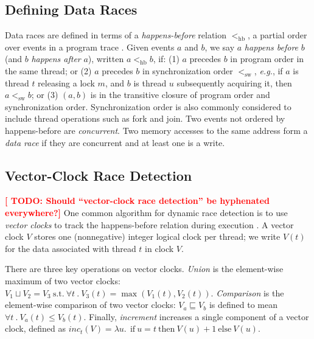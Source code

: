 \documentclass[preprint, 10pt]{sigplanconf}
\newcommand{\eg}{\textit{e.g.}\xspace}
\newcommand{\TODO}[1]{\textbf{\textcolor{red}{[ TODO: #1]}}}
\newcommand{\hb}[0]{<_{\mathrm{hb}}}
\newcommand{\sw}[0]{<_{\mathrm{sw}}}
\newcommand{\Tid}{t}
\newcommand{\TidU}{u}
\newcommand{\Lock}{m}
\newcommand{\VC}{V}
\newcommand{\SuchThat}{\ \text{s.t.}\ }
\newcommand{\Bind}{\ .\ }
\newcommand{\VCMax}{\sqcup}
\newcommand{\VCCompare}{\sqsubseteq}
\begin{document}
\subsection{Defining Data Races}
Data races are defined in terms of a \emph{happens-before} relation $\hb$, a partial order over events in a
program trace \cite{lamporthb}.  Given events $a$ and $b$, we say $a$
\emph{happens before} $b$ (and $b$ \emph{happens after} $a$), written $a \hb b$,
if: (1) $a$ precedes $b$ in program order in the same thread; or (2) $a$
precedes $b$ in synchronization order $\sw$, \eg, if $a$ is thread $\Tid$ releasing a lock $\Lock$, and $b$ is thread $\TidU$ subsequently acquiring it, then $a \sw b$; or (3) $(a,b)$ is in the
transitive closure of program order and synchronization order.
Synchronization order is also commonly considered to include thread operations such as fork and join.
Two events not ordered by happens-before are \emph{concurrent}.  Two
memory accesses to the same address form a \emph{data race} if they are
concurrent and at least one is a write.

\subsection{Vector-Clock Race Detection}
\label{vector-clocks}
\TODO{Should ``vector-clock race detection'' be hyphenated everywhere?}
One common algorithm for dynamic race detection is to use \emph{vector clocks} to track the happens-before relation during
execution \cite{vcfidge,vcmattern}.  A vector clock $\VC$ stores one (nonnegative) integer
logical clock per thread; we write $\VC(\Tid)$ for the data associated with thread $\Tid$ in clock $\VC$.

  There are three key operations on vector clocks.
\emph{Union} is the element-wise maximum of two vector clocks:
$\VC_1 \VCMax \VC_2 = \VC_3 \SuchThat \forall \Tid \Bind \VC_3(\Tid) =
\max(\VC_1(\Tid), \VC_2(\Tid))$. \emph{Comparison} is the element-wise
comparison of two vector clocks: $\VC_a \VCCompare \VC_b$ is defined to mean $\forall
\Tid \Bind \VC_a(\Tid) \leq \VC_b(\Tid)$.  Finally, \emph{increment} increases a single component of a vector clock, defined as $\mathit{inc}_t(V) = \lambda u.\ \mathrm{~if~} u=t \mathrm{~then~} V(u)+1 \mathrm{~else~} V(u)$.
\end{document}
